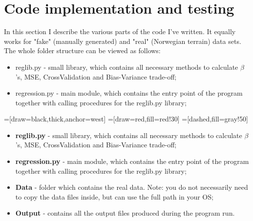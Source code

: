 \section{Code implementation and testing}
\label{sec:code_imp}


In this section I describe the various parts of the code I've written. It equally works for "fake" (manually generated) and "real" (Norwegian terrain) data sets. The whole folder structure can be viewed as follows:
\begin{itemize}
    \item reglib.py - small library, which contains all necessary methods to calculate $\beta$'s, MSE, CrossValidation and Bias-Variance trade-off;
    \item regression.py - main module, which contains the entry point of the program together with calling procedures for the reglib.py library;
\end{itemize}

=[draw=black,thick,anchor=west]
=[draw=red,fill=red!30]
=[dashed,fill=gray!50]
\begin{center}
\end{center}
\begin{itemize}
    \item \textbf{reglib.py} - small library, which contains all necessary methods to calculate $\beta$'s, MSE, CrossValidation and Bias-Variance trade-off;
    \item \textbf{regression.py}  - main module, which contains the entry point of the program together with calling procedures for the reglib.py library;
    \item \textbf{Data} - folder which contains the real data. Note: you do not necessarily need to copy the data files inside, but can use the full path in your OS;
    \item \textbf{Output} - contains all the output files produced during the program run.
\end{itemize}


